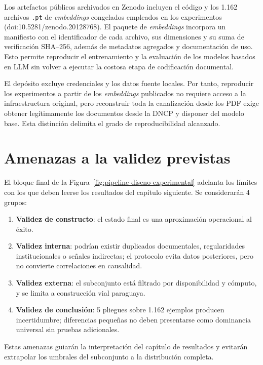 Los artefactos públicos archivados en Zenodo incluyen el código y los 1.162 archivos \texttt{.pt} de \textit{embeddings} congelados empleados en los experimentos (doi:10.5281/zenodo.20128768). El paquete de \textit{embeddings} incorpora un manifiesto con el identificador de cada archivo, sus dimensiones y su suma de verificación SHA--256, además de metadatos agregados y documentación de uso. Esto permite reproducir el entrenamiento y la evaluación de los modelos basados en LLM sin volver a ejecutar la costosa etapa de codificación documental.

El depósito excluye credenciales y los datos fuente locales. Por tanto, reproducir los experimentos a partir de los \textit{embeddings} publicados no requiere acceso a la infraestructura original, pero reconstruir toda la canalización desde los PDF exige obtener legítimamente los documentos desde la DNCP y disponer del modelo base. Esta distinción delimita el grado de reproducibilidad alcanzado.

\section{Amenazas a la validez previstas}
\label{sec:amenazas_validez}

El bloque final de la Figura~\ref{fig:pipeline-diseno-experimental} adelanta los límites con los que deben leerse los resultados del capítulo siguiente. Se considerarán 4 grupos:

\begin{enumerate}
  \item \textbf{Validez de constructo}: el estado final es una aproximación operacional al éxito.
  \item \textbf{Validez interna}: podrían existir duplicados documentales, regularidades institucionales o señales indirectas; el protocolo evita datos posteriores, pero no convierte correlaciones en causalidad.
  \item \textbf{Validez externa}: el subconjunto está filtrado por disponibilidad y cómputo, y se limita a construcción vial paraguaya.
  \item \textbf{Validez de conclusión}: 5 pliegues sobre 1.162 ejemplos producen incertidumbre; diferencias pequeñas no deben presentarse como dominancia universal sin pruebas adicionales.
\end{enumerate}

Estas amenazas guiarán la interpretación del capítulo de resultados y evitarán extrapolar los umbrales del subconjunto a la distribución completa.
